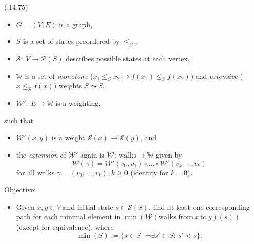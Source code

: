 \begin{textblock}{\mycolwidth}(\leftpos,14.75)
\begin{itemize}
  \item $G = (V, E)$ is a graph,
  \item $S$ is a set of states preordered by $\leq_S$,
  \item $\mathcal S:\ V \to \mathcal P(S)$ describes possible states at each vertex,
  \item $\mathbb W$ is a set of \emph{monotone} ($x_1 \leq_S x_2 \to f(x_1) \leq_S f(x_2)$)
  and \emph{extensive} ($x \leq_S f(x)$) weights $S \leadsto S$,
  \item $\mathcal W':\ E \to \mathbb W$ is a weighting,
\end{itemize}
such that
\begin{itemize}
  \item $\mathcal W'(x, y)$ is a weight $\mathcal S(x) \to \mathcal S(y)$, and
  \item the \emph{extension} of $\mathcal W'$ again is $\mathcal W:\ \text{walks} \to \mathbb W$ given by
  \[\mathcal W(\gamma) = \mathcal W'(v_0, v_1) \circ \ldots \circ \mathcal W'(v_{k-1}, v_k)\]
  for all walks $\gamma = (v_0, \ldots, v_k), k \geq 0$ (identity for $k = 0$).
\end{itemize}
\vspace{0.5em}
Objective:
\begin{itemize}
  \item Given $x, y \in V$ and initial state $s \in \mathcal S(x)$,
  find at least one corresponding path
  for each minimal element in $\min(\mathcal W(\text{walks from}\ x\ \text{to}\ y)(s))$
  (except for equivalence), where
  \[\min(S) := \{s \in S\ |\ \neg\exists s' \in S:\ s' < s\}.\]
\end{itemize}
\end{textblock}

